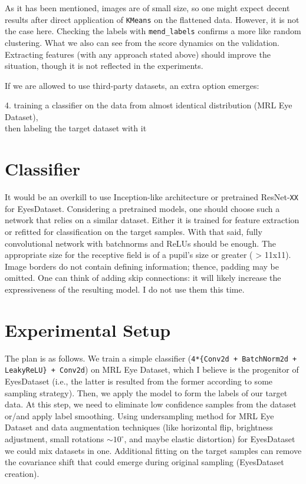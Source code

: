 \documentclass{article}
\begin{document}
As it has been mentioned, images are of small size, so one might expect decent
results after direct application of \verb|KMeans| on the flattened data.
However, it is not the case here. Checking the labels with \verb|mend_labels|
confirms a more like random clustering. What we also can see from the score
dynamics on the validation. Extracting  features (with any approach stated
above) should improve the situation, though it is not reflected in the
experiments.

If we are allowed to use third-party datasets, an extra option emerges:

4. training a classifier on the data from almost identical distribution
   (MRL Eye Dataset), \\\indent\hspace{.3cm} then labeling the target
   dataset with it



\section{Classifier}

It would be an overkill to use Inception-like architecture or pretrained
ResNet-\verb|XX| for EyesDataset. Considering a pretrained models, one should
choose such a network that relies on a similar dataset. Either it is trained
for feature extraction or refitted for classification on the target samples.
With that said, fully convolutional network with batchnorms and ReLUs should be
enough. The appropriate size for the receptive field is of a pupil's size or
greater ( > 11x11). Image borders do not contain defining information; thence,
padding may be omitted. One can think of adding skip connections: it will
likely increase the expressiveness of the resulting model. I do not use them
this time.



\section{Experimental Setup}

The plan is as follows. We train a simple classifier
(\verb|4*{Conv2d + BatchNorm2d + LeakyReLU} + Conv2d|)
on MRL Eye Dataset, which I believe is the progenitor of EyesDataset (i.e., the
latter is resulted from the former according to some sampling strategy). Then,
we apply the model to form the labels of our target data. At this step, we need
to eliminate low confidence samples from the dataset or/and apply label
smoothing. Using undersampling method for MRL Eye Dataset and data augmentation
techniques (like horizontal flip, brightness adjustment, small rotations
$\sim10^{\circ}$, and maybe elastic distortion) for EyesDataset we could mix
datasets in one. Additional fitting on the target samples can remove the
covariance shift that could emerge during original sampling (EyesDataset
creation).
\end{document}
